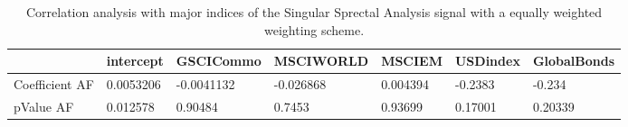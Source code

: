 \begin{table}[H]
\centering
\begin{tabular}{lllllll}
& intercept & GSCICommo & MSCIWORLD & MSCIEM & USDindex & GlobalBonds \\ 
\hline 
Coefficient AF & 0.0053206 & -0.0041132 & -0.026868 & 0.004394 & -0.2383 & -0.234 \\ 
pValue AF & 0.012578 & 0.90484 & 0.7453 & 0.93699 & 0.17001 & 0.20339 \\ 
\hline
\end{tabular}
\caption{Correlation analysis with major indices of the Singular Sprectal Analysis signal with a equally weighted weighting scheme.}
\label{SSA_EW_AFACTOR}
\end{table}
